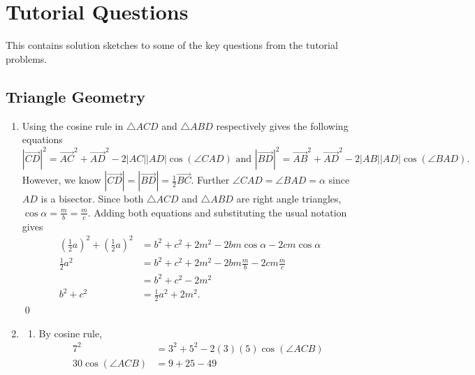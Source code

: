 \section{Tutorial Questions}

This contains solution sketches to some of the key questions from the tutorial problems.

\subsection{Triangle Geometry}

\begin{enumerate}[font=\bfseries]
    \item[2] Using the cosine rule in \(\triangle ACD\) and \(\triangle ABD\) respectively gives the following equations
          \[|\overrightarrow{CD}|^2 = \overrightarrow{AC}^2 + \overrightarrow{AD}^2 - 2|AC||AD|\cos(\angle CAD) \text{ and } |\overrightarrow{BD}|^2 = \overrightarrow{AB}^2 + \overrightarrow{AD}^2 - 2|AB||AD|\cos(\angle BAD).\]
          However, we know \(|\overrightarrow{CD}| = |\overrightarrow{BD}| = \frac{1}{2}\overrightarrow{BC}\). Further \(\angle CAD = \angle BAD = \alpha\) since \(AD\) is a bisector. Since both \(\triangle ACD\) and \(\triangle ABD\) are right angle triangles, \(\cos \alpha = \frac{m}{b} = \frac{m}{c}\). Adding both equations and substituting the usual notation gives
          \begin{align*}
              \left(\frac{1}{2}a\right)^2 + \left(\frac{1}{2}a\right)^2 & = b^2 + c^2 + 2m^2 - 2bm\cos\alpha - 2cm\cos\alpha     \\
              \frac{1}{2}a^2                                            & = b^2 + c^2 + 2m^2 - 2bm \frac{m}{b} - 2cm \frac{m}{c} \\
                                                                        & = b^2 + c^2 - 2m^2                                     \\
              b^2 + c^2                                                 & = \frac{1}{2}a^2 + 2m^2.
          \end{align*}
          \qed
    \item[3] \begin{enumerate}[font=\bfseries]
              \item[a.] By cosine rule,
                    \begin{align*}
                        7^2                & = 3^2 + 5^2 - 2(3)(5)\cos(\angle ACB) \\
                        30\cos(\angle ACB) & = 9 + 25 - 49                         \\

\end{align*}
\end{enumerate}
\end{enumerate}
